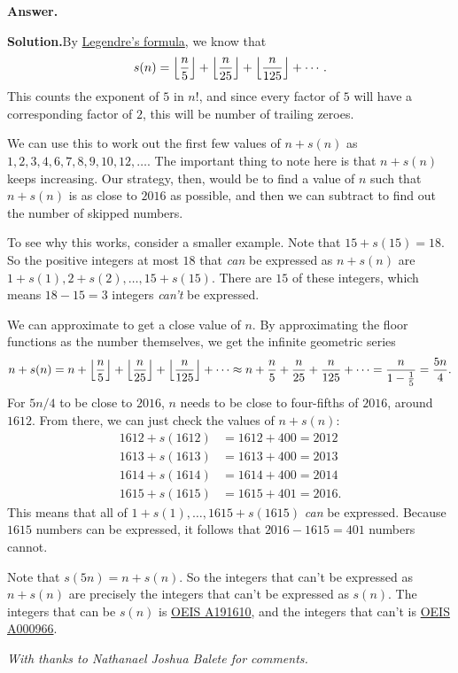 \documentclass[11pt,paper=letter]{scrartcl}
\newcommand{\ans}{{\sffamily \bfseries Answer.}\;}
\newcommand{\sol}{{\sffamily \bfseries Solution.}\;}
\newenvironment{rem}%
{\noindent \ignorespaces \small \sffamily \sansmath {\bfseries Remark.}}%
{\ignorespacesafterend}
\begin{document}
\begin{enumerate}[left=0pt]
\ans{$401$}

\sol By \href{https://en.wikipedia.org/wiki/Legendre%27s_formula}{Legendre's formula}, we know that \[
  s(n) = \left\lfloor \frac{n}{5} \right\rfloor + \left\lfloor \frac{n}{25} \right\rfloor + \left\lfloor \frac{n}{125} \right\rfloor + \cdots.
\]
This counts the exponent of $5$ in $n!$, and since every factor of $5$ will have a corresponding factor of $2$, this will be number of trailing zeroes.

We can use this to work out the first few values of $n + s(n)$ as $1, 2, 3, 4, 6, 7, 8, 9, 10, 12, \ldots$. The important thing to note here is that $n + s(n)$ keeps increasing. Our strategy, then, would be to find a value of $n$ such that $n + s(n)$ is as close to $2016$ as possible, and then we can subtract to find out the number of skipped numbers.

To see why this works, consider a smaller example. Note that $15 + s(15) = 18$. So the positive integers at most $18$ that \textit{can} be expressed as $n + s(n)$ are $1 + s(1), 2 + s(2), \ldots, 15 + s(15)$. There are $15$ of these integers, which means $18 - 15 = 3$ integers \textit{can't} be expressed.

We can approximate to get a close value of $n$. By approximating the floor functions as the number themselves, we get the infinite geometric series \[
  n + s(n) = n + \left\lfloor \frac{n}{5} \right\rfloor + \left\lfloor \frac{n}{25} \right\rfloor + \left\lfloor \frac{n}{125} \right\rfloor + \cdots
  \approx n + {\frac{n}{5}} + {\frac{n}{25}} + {\frac{n}{125}} + \cdots = \frac{n}{1 - \frac{1}{5}} = \frac{5n}{4}.
\]
For $5n/4$ to be close to $2016$, $n$ needs to be close to four-fifths of $2016$, around $1612$. From there, we can just check the values of $n + s(n)$:
\begin{align*}
1612 + s(1612) &= 1612 + 400 = 2012 \\
1613 + s(1613) &= 1613 + 400 = 2013 \\
1614 + s(1614) &= 1614 + 400 = 2014 \\
1615 + s(1615) &= 1615 + 401 = 2016.
\end{align*}
This means that all of $1 + s(1), \ldots, 1615 + s(1615)$ \textit{can} be expressed. Because $1615$ numbers can be expressed, it follows that $2016 - 1615 = 401$ numbers cannot.

\begin{rem}
Note that $s(5n) = n + s(n)$. So the integers that can't be expressed as $n + s(n)$ are precisely the integers that can't be expressed as $s(n)$. The integers that can be $s(n)$ is \href{http://oeis.org/A191610}{OEIS A191610}, and the integers that can't is \href{http://oeis.org/A000966}{OEIS A000966}.
\end{rem}

\end{enumerate}

\emph{With thanks to Nathanael Joshua Balete for comments.}
\end{document}
